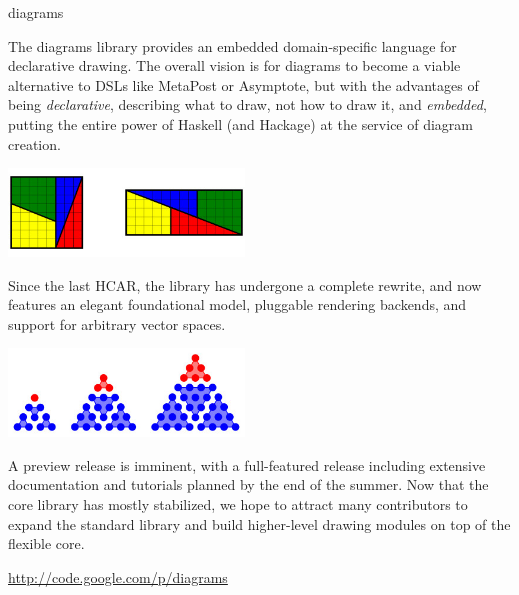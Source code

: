 

% 

\begin{hcarentry}[updated]{diagrams}
\makeheader

The diagrams library provides an embedded domain-specific language for
declarative drawing.  The overall vision is for diagrams to become a
viable alternative to DSLs like MetaPost or Asymptote, but with the
advantages of being \emph{declarative}, describing what to draw, not
how to draw it, and \emph{embedded}, putting the entire power of
Haskell (and Hackage) at the service of diagram creation.

\begin{center}
\includegraphics[width=0.47\textwidth]{paradox.jpg}
\end{center}

Since the last HCAR, the library has undergone a complete rewrite, and
now features an elegant foundational model, pluggable rendering
backends, and support for arbitrary vector spaces.

\begin{center}
\includegraphics[width=0.47\textwidth]{triangular-numbers.jpg}  
\end{center}

\FuturePlans

A preview release is imminent, with a full-featured release including
extensive documentation and tutorials planned by the end of the
summer.  Now that the core library has mostly stabilized, we hope to
attract many contributors to expand the standard library and build
higher-level drawing modules on top of the flexible core.

\FurtherReading
\begin{compactitem}
\item  \url{http://code.google.com/p/diagrams}
\end{compactitem}
\end{hcarentry}

% 